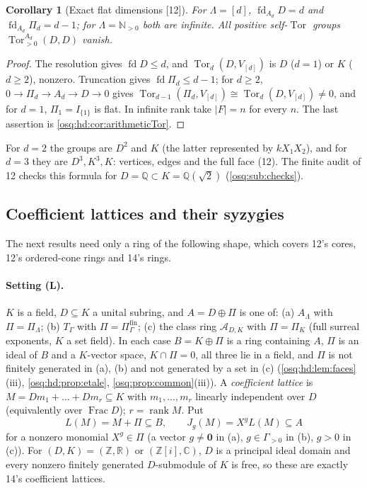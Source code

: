 \documentclass[11pt,letterpaper]{article}
\numberwithin{equation}{section}
\newtheorem{corollary}[corollary]{Corollary}
\theoremstyle{definition}
\theoremstyle{remark}
\theoremstyle{plain}
\newcommand{\Z}{\mathbb Z}
\newcommand{\Q}{\mathbb Q}
\newcommand{\R}{\mathbb R}
\newcommand{\C}{\mathbb C}
\newcommand{\N}{\mathbb N}
\newcommand{\A}{\mathcal A}          %
\newcommand{\Frac}{\operatorname{Frac}}
\newcommand{\Tor}{\operatorname{Tor}}
\newcommand{\fd}{\operatorname{fd}}
\newcommand{\rk}{\operatorname{rank}}
\newcommand{\src}[1]{\textup{\textsf{[#1]}}}
\begin{document}
\begin{corollary}[Exact flat dimensions \src{12}]\label{osq:hd:cor:fd}
For $\Lambda=[d]$, $\fd_{A_d}D=d$ and $\fd_{A_d}\Pi_d=d-1$; for $\Lambda=\N_{>0}$ both are infinite. All positive
self-$\Tor$ groups $\Tor^{A_d}_{>0}(D,D)$ vanish.
\end{corollary}
\begin{proof}
The resolution gives $\fd D\le d$, and $\Tor_d(D,V_{[d]})$ is $D$ ($d=1$) or $K$ ($d\ge2$), nonzero. Truncation gives
$\fd\Pi_d\le d-1$; for $d\ge2$, $0\to\Pi_d\to A_d\to D\to0$ gives $\Tor_{d-1}(\Pi_d,V_{[d]})\cong\Tor_d(D,V_{[d]})\ne0$,
and for $d=1$, $\Pi_1=I_{\{1\}}$ is flat. In infinite rank take $|F|=n$ for every $n$. The last assertion is
\cref{osq:hd:cor:arithmeticTor}.
\end{proof}

For $d=2$ the groups are $D^2$ and $K$ (the latter represented by $kX_1X_2$), and for $d=3$ they are $D^3,K^3,K$:
vertices, edges and the full face (12). The finite audit of 12 checks this formula for $D=\Q\subset K=\Q(\sqrt2)$
(\cref{osq:sub:checks}).

\subsection{Coefficient lattices and their syzygies}\label{osq:tn:sub:lattices}

The next results need only a ring of the following shape, which covers 12's cores, 12's ordered-cone rings and 14's
rings.

\paragraph{Setting (L).} $K$ is a field, $D\subseteq K$ a unital subring, and $A=D\oplus\Pi$ is one of:
(a) $A_\Lambda$ with $\Pi=\Pi_\Lambda$; (b) $T_\Gamma$ with $\Pi=\Pi^{\mathrm{fin}}_\Gamma$; (c) the class ring
$\A_{D,K}$ with $\Pi=\Pi_K$ (full surreal exponents, $K$ a set field). In each case $B=K\oplus\Pi$ is a ring containing
$A$, $\Pi$ is an ideal of $B$ and a $K$-vector space, $K\cap\Pi=0$, all three lie in a field, and $\Pi$ is not finitely
generated in (a), (b) and not generated by a set in (c) (\cref{osq:hd:lem:faces}(iii), \cref{osq:hd:prop:etale},
\cref{osq:prop:common}(iii)). A \emph{coefficient lattice} is $M=Dm_1+\dots+Dm_r\subseteq K$ with $m_1,\dots,m_r$
linearly independent over $D$ (equivalently over $\Frac D$); $r=\rk M$. Put
\[
 L(M)=M+\Pi\subseteq B,\qquad J_g(M)=X^gL(M)\subseteq A
\]
for a nonzero monomial $X^g\in\Pi$ (a vector $g\ne\mathbf0$ in (a), $g\in\Gamma_{>0}$ in (b), $g>0$ in (c)). For
$(D,K)=(\Z,\R)$ or $(\Z[i],\C)$, $D$ is a principal ideal domain and every nonzero finitely generated $D$-submodule of
$K$ is free, so these are exactly 14's coefficient lattices.
\end{document}
